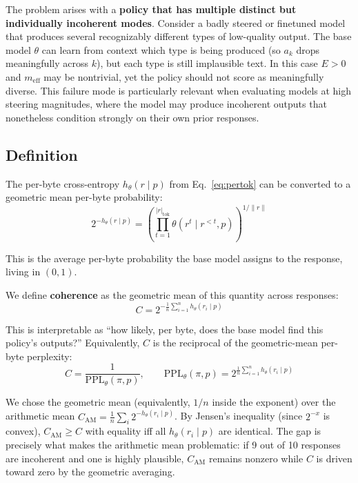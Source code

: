 \documentclass[11pt]{article}
\begin{document}
The problem arises with a \textbf{policy that has multiple distinct but individually incoherent modes}. Consider a badly steered or finetuned model that produces several recognizably different types of low-quality output. The base model $\theta$ can learn from context which type is being produced (so $a_k$ drops meaningfully across $k$), but each type is still implausible text. In this case $E > 0$ and $m_{\mathrm{eff}}$ may be nontrivial, yet the policy should not score as meaningfully diverse. This failure mode is particularly relevant when evaluating models at high steering magnitudes, where the model may produce incoherent outputs that nonetheless condition strongly on their own prior responses.

\subsection{Definition}

The per-byte cross-entropy $h_\theta(r \mid p)$ from Eq.~\eqref{eq:pertok} can be converted to a geometric mean per-byte probability:
\begin{equation}
    2^{-h_\theta(r \mid p)} = \left(\prod_{t=1}^{|r|_{\mathrm{tok}}} \theta(r^t \mid r^{<t}, p)\right)^{1/\|r\|}
\end{equation}

This is the average per-byte probability the base model assigns to the response, living in $(0,1)$.

We define \textbf{coherence} as the geometric mean of this quantity across responses:
\begin{equation}\label{eq:coherence}
    C = 2^{-\frac{1}{n}\sum_{i=1}^{n} h_\theta(r_i \mid p)}
\end{equation}

This is interpretable as ``how likely, per byte, does the base model find this policy's outputs?'' Equivalently, $C$ is the reciprocal of the geometric-mean per-byte perplexity:
\begin{equation}
    C = \frac{1}{\mathrm{PPL}_\theta(\pi, p)}, \qquad \mathrm{PPL}_\theta(\pi, p) = 2^{\frac{1}{n}\sum_{i=1}^{n} h_\theta(r_i \mid p)}
\end{equation}

We chose the geometric mean (equivalently, $1/n$ inside the exponent) over the arithmetic mean $C_{\mathrm{AM}} = \frac{1}{n}\sum_i 2^{-h_\theta(r_i \mid p)}$. By Jensen's inequality (since $2^{-x}$ is convex), $C_{\mathrm{AM}} \geq C$ with equality iff all $h_\theta(r_i \mid p)$ are identical. The gap is precisely what makes the arithmetic mean problematic: if 9 out of 10 responses are incoherent and one is highly plausible, $C_{\mathrm{AM}}$ remains nonzero while $C$ is driven toward zero by the geometric averaging.
\end{document}
